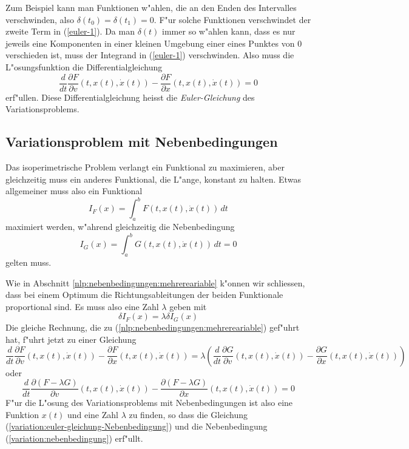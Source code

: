 Zum Beispiel kann man Funktionen w"ahlen, die an den Enden des Intervalles
verschwinden, also $\delta(t_0)=\delta(t_1)=0$.
F"ur solche Funktionen verschwindet der zweite Term in
(\ref{euler-1}). Da man $\delta(t)$ immer so w"ahlen kann, dass es
nur jeweils eine Komponenten in einer kleinen Umgebung einer eines
Punktes von $0$ verschieden ist, muss
der Integrand in (\ref{euler-1}) verschwinden.
Also muss die L"osungsfunktion die Differentialgleichung
\begin{equation}
\frac{d}{dt}\frac{\partial F}{\partial v}(t,x(t),\dot x(t))
-
\frac{\partial F}{\partial x}(t,x(t),\dot x(t))
=
0
\label{variation:euler-gleichung}
\end{equation}
erf"ullen. Diese Differentialgleichung heisst die {\it Euler-Gleichung}
des Variationsproblems.

\subsection{Variationsproblem mit Nebenbedingungen\label{variation:section-variationsproblem-nebenbedingungen}}
Das isoperimetrische Problem verlangt ein Funktional zu maximieren,
aber gleichzeitig muss ein anderes Funktional, die L"ange, konstant
zu halten. Etwas allgemeiner muss also ein Funktional
\[
I_F(x)=
\int_a^bF(t, x(t), \dot x(t))\,dt
\]
maximiert werden, w"ahrend gleichzeitig die Nebenbedingung
\begin{equation}
I_G(x)=
\int_a^b G(t, x(t), \dot x(t))\, dt = 0
\label{variation:nebenbedingung}
\end{equation}
gelten muss.

Wie in Abschnitt \ref{nlp:nebenbedingungen:mehrereariable} k"onnen wir
schliessen, dass bei einem Optimum die Richtungsableitungen
der beiden Funktionale proportional sind. Es muss also eine Zahl
$\lambda$ geben mit
\[
\delta I_F(x)=\lambda \delta I_G(x)
\]
Die gleiche Rechnung, die zu 
(\ref{nlp:nebenbedingungen:mehrereariable})
gef"uhrt hat, f"uhrt jetzt zu einer Gleichung
\begin{equation}
\frac{d}{dt}\frac{\partial F}{\partial v}(t,x(t),\dot x(t))
-
\frac{\partial F}{\partial x}(t,x(t),\dot x(t))
=
\lambda \left(
\frac{d}{dt}\frac{\partial G}{\partial v}(t,x(t),\dot x(t))
-
\frac{\partial G}{\partial x}(t,x(t),\dot x(t))
\right)
\end{equation}
oder 
\begin{equation}
\frac{d}{dt}\frac{\partial (F-\lambda G)}{\partial v}(t,x(t),\dot x(t))
-
\frac{\partial (F-\lambda G)}{\partial x}(t,x(t),\dot x(t))
=
0
\label{variation:euler-gleichung-Nebenbedingung}
\end{equation}
F"ur die L"osung des Variationsproblems mit Nebenbedingungen ist also
eine Funktion $x(t)$ und eine Zahl $\lambda$ zu finden, so
dass die Gleichung 
(\ref{variation:euler-gleichung-Nebenbedingung}) und
die Nebenbedingung
(\ref{variation:nebenbedingung})
erf"ullt.

